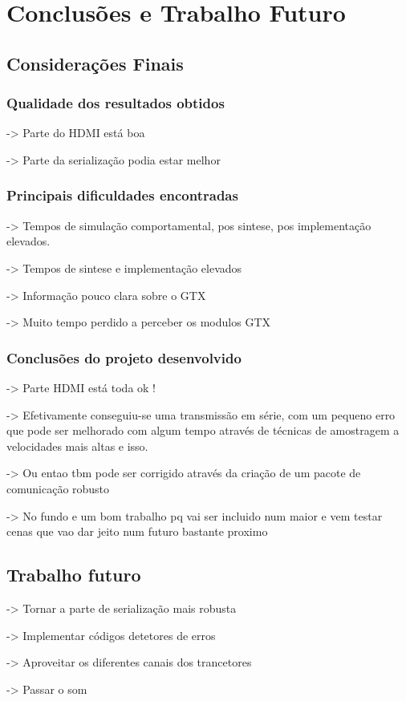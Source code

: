 \chapter{Conclusões e Trabalho Futuro} \label{chap:concl}


\section{Considerações Finais} \label{chap6:cons_final}

\subsection*{Qualidade dos resultados obtidos}
-> Parte do HDMI está boa

-> Parte da serialização podia estar melhor


\subsection*{Principais dificuldades encontradas}

-> Tempos de simulação comportamental, pos sintese, pos implementação elevados.

-> Tempos de sintese e implementação elevados

-> Informação pouco clara sobre o GTX

-> Muito tempo perdido a perceber os modulos GTX

\subsection*{Conclusões do projeto desenvolvido}

-> Parte HDMI está toda ok !

-> Efetivamente conseguiu-se uma transmissão em série, com um pequeno erro que pode ser melhorado com algum tempo através de técnicas de amostragem a velocidades mais altas e isso.

-> Ou entao tbm pode ser corrigido através da criação de um pacote de comunicação robusto

-> No fundo e um bom trabalho pq vai ser incluido num maior e vem testar cenas que vao dar jeito num futuro bastante proximo


\section{Trabalho futuro}

-> Tornar a parte de serialização mais robusta

-> Implementar códigos detetores de erros

-> Aproveitar os diferentes canais dos trancetores

-> Passar o som 
